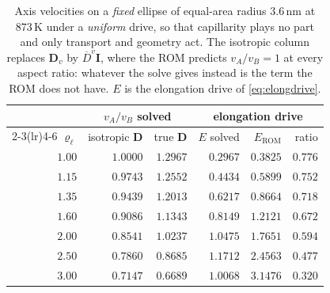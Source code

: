 \documentclass{article}
\newcommand{\Dten}{\bm D}
\begin{document}
\begin{table}[htbp]
\centering
\caption{Axis velocities on a \emph{fixed} ellipse of equal-area radius
$3.6\,$nm at $873\,$K under a \emph{uniform} drive, so that capillarity plays no
part and only transport and geometry act. The isotropic column replaces
$\Dten_v$ by $\overline D^{v}\bm I$, where the ROM predicts $v_A/v_B=1$ at every
aspect ratio: whatever the solve gives instead is the term the ROM does not have.
$E$ is the elongation drive of \cref{eq:elongdrive}.}
\label{tab:shape-mechanism}
\begin{tabular}{@{}r rr rrr@{}}
\toprule
 & \multicolumn{2}{c}{$v_A/v_B$ solved} & \multicolumn{3}{c}{elongation drive}\\
\cmidrule(lr){2-3}\cmidrule(lr){4-6}
$\varrho_\ell$ & isotropic $\Dten$ & true $\Dten$
 & $E$ solved & $E_{\mathrm{ROM}}$ & ratio\\
\midrule
$1.00$ & $\mathbf{1.0000}$ & $1.2967$ & $0.2967$ & $0.3825$ & $0.776$\\
$1.15$ & $0.9743$ & $1.2552$ & $0.4434$ & $0.5899$ & $0.752$\\
$1.35$ & $0.9439$ & $1.2013$ & $0.6217$ & $0.8664$ & $0.718$\\
$1.60$ & $0.9086$ & $1.1343$ & $0.8149$ & $1.2121$ & $0.672$\\
$2.00$ & $0.8541$ & $1.0237$ & $1.0475$ & $1.7651$ & $0.594$\\
$2.50$ & $0.7860$ & $0.8685$ & $\mathbf{1.1712}$ & $2.4563$ & $0.477$\\
$3.00$ & $0.7147$ & $0.6689$ & $1.0068$ & $3.1476$ & $\mathbf{0.320}$\\
\bottomrule
\end{tabular}
\end{table}
\end{document}
